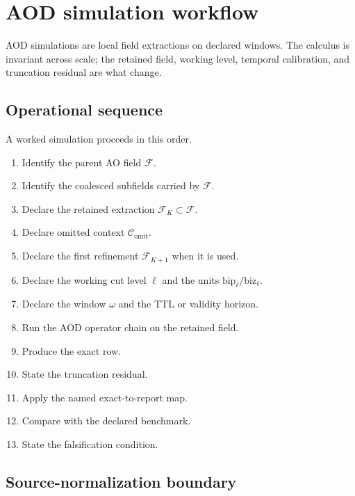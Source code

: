 \section{AOD simulation workflow}
\label{man:aod-simulation-workflow}

AOD simulations are local field extractions on declared windows. The calculus is invariant across scale; the retained field, working level, temporal calibration, and truncation residual are what change.

\subsection{Operational sequence}
\label{man:workflow-operational-sequence}

A worked simulation proceeds in this order.
\begin{enumerate}[label=\arabic*.]
  \item Identify the parent AO field \(\mathcal F\).
  \item Identify the coalesced subfields carried by \(\mathcal F\).
  \item Declare the retained extraction \(\mathcal F_K\subset\mathcal F\).
  \item Declare omitted context \(\mathcal C_{\mathrm{omit}}\).
  \item Declare the first refinement \(\mathcal F_{K+1}\) when it is used.
  \item Declare the working cut level \(\ell\) and the units \(\mathrm{bip}_{\ell}/\mathrm{biz}_{\ell}\).
  \item Declare the window \(\omega\) and the TTL or validity horizon.
  \item Run the AOD operator chain on the retained field.
  \item Produce the exact row.
  \item State the truncation residual.
  \item Apply the named exact-to-report map.
  \item Compare with the declared benchmark.
  \item State the falsification condition.

\end{enumerate}

\subsection{Source-normalization boundary}
\label{man:source-normalization-boundary}

